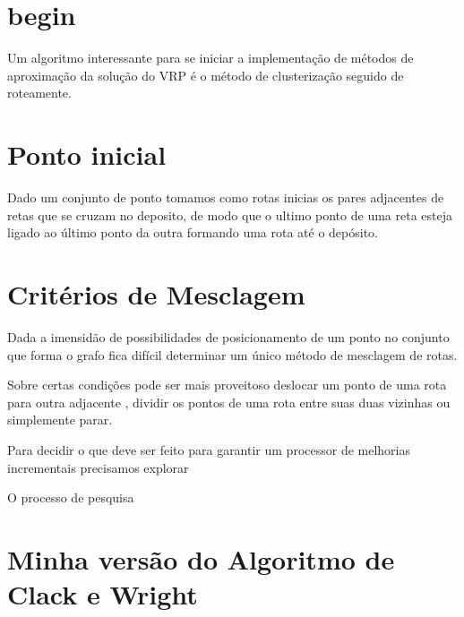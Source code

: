 \documentclass[a4paper,12pt]{article}
\begin{document}
\section{begin}

 Um algoritmo interessante para se iniciar a implementação de métodos de aproximação da solução do
VRP é o método de clusterização seguido de roteamente.

\section{Ponto inicial}

 Dado um conjunto de ponto tomamos como rotas inicias os pares adjacentes de retas que se cruzam no
deposito, de modo que o ultimo ponto de uma reta esteja ligado ao último ponto da outra formando uma
rota até o depósito. 

\section{Critérios de Mesclagem}

 Dada a imensidão de possibilidades de posicionamento de um ponto no conjunto que forma o grafo fica
difícil determinar um único método de mesclagem de rotas.

 Sobre certas condições pode ser mais proveitoso deslocar um ponto de uma rota para outra adjacente
, dividir os pontos de uma rota entre suas duas vizinhas ou simplemente parar.

 Para decidir o que deve ser feito para garantir um processor de melhorias incrementais precisamos
explorar 

 O processo de pesquisa 



\section{Minha versão do Algoritmo de Clack e Wright}
\end{document}
